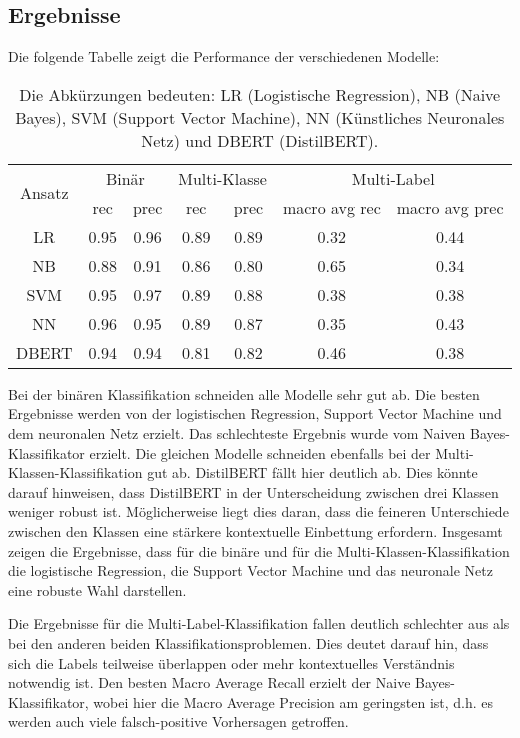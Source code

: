 \subsection{Ergebnisse}
Die folgende Tabelle zeigt die Performance der verschiedenen Modelle:
\begin{table}[h]
    \centering
    \begin{tabular}{|c|c|c|c|c|c|c|}
        \hline
        \multirow{2}{*}{Ansatz} & \multicolumn{2}{c|}{Binär} & \multicolumn{2}{c|}{Multi-Klasse} & \multicolumn{2}{c|}{Multi-Label} \\
        \cline{2-7}
        & rec & prec & rec & prec & macro avg rec & macro avg prec \\
        \hline
        LR & 0.95 & 0.96 & 0.89 & 0.89 & 0.32 & 0.44 \\
        \hline
        NB & 0.88 & 0.91 & 0.86 & 0.80 & 0.65 & 0.34 \\
        \hline
        SVM & 0.95 & 0.97 & 0.89 & 0.88 & 0.38 & 0.38 \\
        \hline
        NN & 0.96 & 0.95 & 0.89 & 0.87 & 0.35 & 0.43 \\
        \hline
        DBERT & 0.94 & 0.94 & 0.81 & 0.82 & 0.46 & 0.38 \\
        \hline
    \end{tabular}
    \caption{Die Abkürzungen bedeuten: LR (Logistische Regression), NB (Naive Bayes), SVM (Support Vector Machine), NN (Künstliches Neuronales Netz) und DBERT (DistilBERT).}
\end{table}

Bei der binären Klassifikation schneiden alle Modelle sehr gut ab. Die besten Ergebnisse werden von der logistischen Regression, Support Vector Machine und dem neuronalen Netz erzielt. Das schlechteste Ergebnis wurde vom Naiven Bayes-Klassifikator erzielt. Die gleichen Modelle schneiden ebenfalls bei der Multi-Klassen-Klassifikation gut ab. DistilBERT fällt hier deutlich ab. Dies könnte darauf hinweisen, dass DistilBERT in der Unterscheidung zwischen drei Klassen weniger robust ist. Möglicherweise liegt dies daran, dass die feineren Unterschiede zwischen den Klassen eine stärkere kontextuelle Einbettung erfordern. Insgesamt zeigen die Ergebnisse, dass für die binäre und für die Multi-Klassen-Klassifikation die logistische Regression, die Support Vector Machine und das neuronale Netz eine robuste Wahl darstellen.

Die Ergebnisse für die Multi-Label-Klassifikation fallen deutlich schlechter aus als bei den anderen beiden Klassifikationsproblemen. Dies deutet darauf hin, dass sich die Labels teilweise überlappen oder mehr kontextuelles Verständnis notwendig ist. Den besten Macro Average Recall erzielt der Naive Bayes-Klassifikator, wobei hier die Macro Average Precision am geringsten ist, d.h. es werden auch viele falsch-positive Vorhersagen getroffen.
